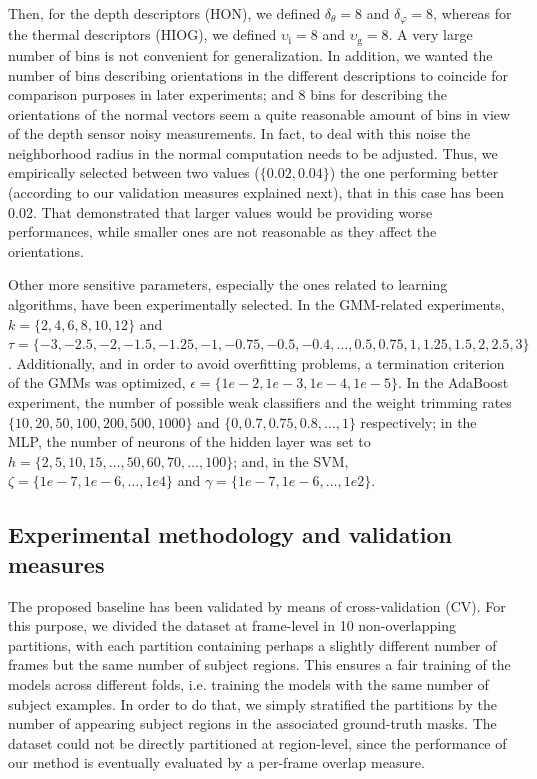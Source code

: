\documentclass[10pt,twocolumn,letterpaper]{article}
\begin{document}
Then, for the depth descriptors (HON), we defined $\delta_\theta = 8$ and $\delta_\varphi = 8$, whereas for the thermal descriptors (HIOG), we defined $\upsilon_{\mathrm{i}} = 8$ and $\upsilon_{\mathrm{g}} = 8$. A very large number of bins is not convenient for generalization. In addition, we wanted the number of bins describing orientations in the different descriptions to coincide for comparison purposes in later experiments; and 8 bins for describing the orientations of the normal vectors seem a quite reasonable amount of bins in view of the depth sensor noisy measurements. In fact, to deal with this noise the neighborhood radius in the normal computation needs to be adjusted. Thus, we empirically selected between two values ($\{0.02, 0.04\}$) the one performing better (according to our validation measures explained next), that in this case has been 0.02. That demonstrated that larger values would be providing worse performances, while smaller ones are not reasonable as they affect the orientations.

Other more sensitive parameters, especially the ones related to learning algorithms, have been experimentally selected. In the GMM-related experiments, $k = \{2,4,6,8,10,12\}$ and $\tau = \{-3, -2.5, -2, -1.5, -1.25, -1, -0.75, -0.5, -0.4, \ldots, 0.5, 0.75, 1, 1.25, 1.5, 2, 2.5, 3\}$. Additionally, and in order to avoid overfitting problems, a termination criterion of the GMMs was optimized, $\epsilon = \{1e-2, 1e-3, 1e-4, 1e-5\}$. In the AdaBoost experiment, the number of possible weak classifiers and the weight trimming rates $\{10, 20, 50, 100, 200, 500, 1000\}$ and $\{0, 0.7, 0.75, 0.8, \ldots, 1\}$ respectively; in the MLP, the number of neurons of the hidden layer was set to $h = \{2, 5, 10, 15, \ldots, 50, 60, 70, \ldots, 100\}$; and, in the SVM, $\zeta = \{1e-7, 1e-6, \ldots, 1e4\}$ and $\gamma = \{1e-7, 1e-6, \ldots, 1e2\}$.



\subsection{Experimental methodology and validation measures}
\label{ssec:validation}

The proposed baseline has been validated by means of cross-validation (CV). For this purpose, we divided the dataset at frame-level in 10 non-overlapping partitions, with each partition containing perhaps a slightly different number of frames but the same number of subject regions. This ensures a fair training of the models across different folds, i.e. training the models with the same number of subject examples. In order to do that, we simply stratified the partitions by the number of appearing subject regions in the associated ground-truth masks. The dataset could not be directly partitioned at region-level, since the performance of our method is eventually evaluated by a per-frame overlap measure.
\end{document}
